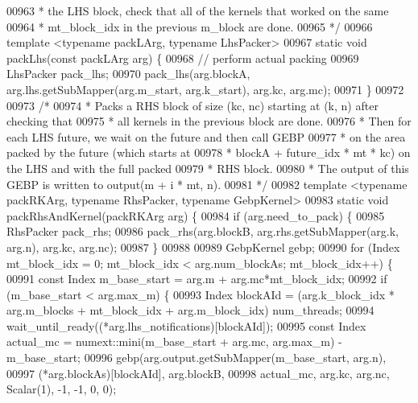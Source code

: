 \begin{DoxyCode}
{00963 \textcolor{comment}{   * the LHS block, check that all of the kernels that worked on the same}
00964 \textcolor{comment}{   * mt\_block\_idx in the previous m\_block are done.}
00965 \textcolor{comment}{   */}
00966   \textcolor{keyword}{template} <\textcolor{keyword}{typename} packLArg, \textcolor{keyword}{typename} LhsPacker>
00967   \textcolor{keyword}{static} \textcolor{keywordtype}{void} packLhs(\textcolor{keyword}{const} packLArg arg) \{
00968     \textcolor{comment}{// perform actual packing}
00969     LhsPacker pack\_lhs;
00970     pack\_lhs(arg.blockA, arg.lhs.getSubMapper(arg.m\_start, arg.k\_start), arg.kc, arg.mc);
00971   \}
00972 
00973   \textcolor{comment}{/*}
00974 \textcolor{comment}{   * Packs a RHS block of size (kc, nc) starting at (k, n) after checking that}
00975 \textcolor{comment}{   * all kernels in the previous block are done.}
00976 \textcolor{comment}{   * Then for each LHS future, we wait on the future and then call GEBP}
00977 \textcolor{comment}{   * on the area packed by the future (which starts at}
00978 \textcolor{comment}{   * blockA + future\_idx * mt * kc) on the LHS and with the full packed}
00979 \textcolor{comment}{   * RHS block.}
00980 \textcolor{comment}{   * The output of this GEBP is written to output(m + i * mt, n).}
00981 \textcolor{comment}{   */}
00982   \textcolor{keyword}{template} <\textcolor{keyword}{typename} packRKArg, \textcolor{keyword}{typename} RhsPacker, \textcolor{keyword}{typename} GebpKernel>
00983   \textcolor{keyword}{static} \textcolor{keywordtype}{void} packRhsAndKernel(packRKArg arg) \{
00984     \textcolor{keywordflow}{if} (arg.need\_to\_pack) \{
00985       RhsPacker pack\_rhs;
00986       pack\_rhs(arg.blockB, arg.rhs.getSubMapper(arg.k, arg.n), arg.kc, arg.nc);
00987     \}
00988 
00989     GebpKernel gebp;
00990     \textcolor{keywordflow}{for} (Index mt\_block\_idx = 0; mt\_block\_idx < arg.num\_blockAs; mt\_block\_idx++) \{
00991       \textcolor{keyword}{const} Index m\_base\_start = arg.m + arg.mc*mt\_block\_idx;
00992       \textcolor{keywordflow}{if} (m\_base\_start < arg.max\_m) \{
00993         Index blockAId = (arg.k\_block\_idx * arg.m\_blocks + mt\_block\_idx + arg.m\_block\_idx) %
      num\_threads;
00994         wait\_until\_ready((*arg.lhs\_notifications)[blockAId]);
00995         \textcolor{keyword}{const} Index actual\_mc = numext::mini(m\_base\_start + arg.mc, arg.max\_m) - m\_base\_start;
00996         gebp(arg.output.getSubMapper(m\_base\_start, arg.n),
00997              (*arg.blockAs)[blockAId], arg.blockB,
00998              actual\_mc, arg.kc, arg.nc, Scalar(1), -1, -1, 0, 0);
}
\end{DoxyCode}
